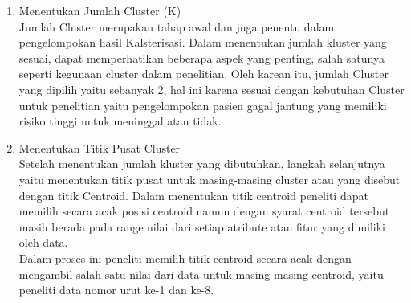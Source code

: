 \documentclass[english,12pt,a4paper,openany]{book}
\begin{document}
	\begin{enumerate}
		\item  Menentukan Jumlah Cluster (K)\\
		Jumlah Cluster merupakan tahap awal dan juga penentu dalam pengelompokan hasil Kalsterisasi. Dalam menentukan jumlah kluster yang sesuai, dapat memperhatikan beberapa aspek yang penting, salah satunya seperti kegunaan cluster dalam penelitian. Oleh karean itu, jumlah Cluster yang dipilih yaitu sebanyak 2, hal ini karena sesuai dengan kebutuhan Cluster untuk penelitian yaitu pengelompokan pasien gagal jantung yang memiliki risiko tinggi untuk meninggal atau tidak.
		
		\item Menentukan Titik Pusat Cluster\\
		Setelah menentukan jumlah kluster yang dibutuhkan, langkah selanjutnya yaitu menentukan titik pusat untuk masing-masing cluster atau yang disebut dengan titik Centroid. Dalam menentukan titik centroid peneliti dapat memilih secara acak posisi centroid namun dengan syarat centroid tersebut masih berada pada range nilai dari setiap atribute atau fitur yang dimiliki oleh data.\\
		Dalam proses ini peneliti memilih titik centroid secara acak dengan mengambil salah satu nilai dari data untuk masing-masing centroid, yaitu peneliti data nomor urut ke-1 dan ke-8.
		\begin{table}[ht]
			\caption{Data Centroid}
			\label{tab:Data Centroid}
		\end{table}
		

\end{enumerate}
\end{document}
